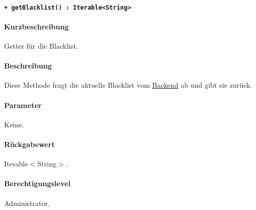 \paragraph{\texttt{+ getBlacklist() : Iterable<String>}}\label{AP_Framework_getBlacklist}%
\paragraph*{Kurzbeschreibung}
Getter für die Blacklist.
\paragraph*{Beschreibung}
Diese Methode fragt die aktuelle Blacklist vom \hyperref[AP_Backend]{Backend} ab und gibt sie zurück.
\paragraph*{Parameter}
Keine.
\paragraph*{Rückgabewert}
Iterable$<$String$>$.
\paragraph*{Berechtigungslevel}
Administrator.